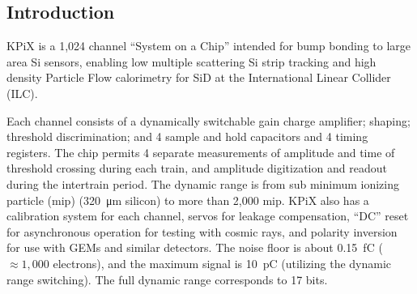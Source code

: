
\subsection{Introduction}
KPiX is a 1,024 channel ``System on a Chip'' intended for bump bonding to large area Si sensors, enabling low multiple scattering Si strip tracking and high density Particle Flow calorimetry for SiD at the International Linear Collider (ILC).

Each channel consists of a dynamically switchable gain charge amplifier; shaping; threshold discrimination; and 4 sample and hold capacitors and 4 timing registers. The chip permits 4 separate measurements of amplitude and time of threshold crossing during each train, and amplitude digitization and readout during the intertrain period. The dynamic range is from sub minimum ionizing particle (mip) (\SI{320}{\micro\meter} silicon) to more than 2,000 mip. KPiX also has a calibration system for each channel, servos for leakage compensation, ``DC'' reset for asynchronous operation for testing with cosmic rays, and polarity inversion for use with GEMs and similar detectors. The noise floor is about \SI{0.15}{fC} ($\approx 1,000$ electrons), and the maximum signal is \SI{10}{pC} (utilizing the dynamic range switching). The full dynamic range corresponds to 17 bits.

